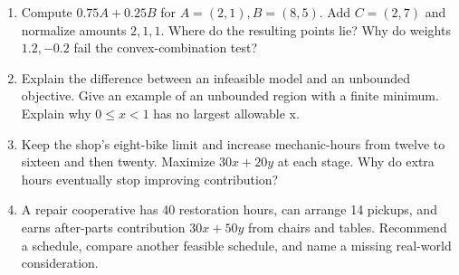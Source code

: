 \documentclass[11pt,letterpaper]{article}
\begin{document}
\begin{enumerate}
\item Compute $0.75A+0.25B$ for $A=(2,1),B=(8,5)$. Add $C=(2,7)$ and normalize amounts $2,1,1$. Where do the resulting points lie? Why do weights $1.2,-0.2$ fail the convex-combination test?
\item Explain the difference between an infeasible model and an unbounded objective. Give an example of an unbounded region with a finite minimum. Explain why $0\leq x<1$ has no largest allowable x.
\item Keep the shop's eight-bike limit and increase mechanic-hours from twelve to sixteen and then twenty. Maximize $30x+20y$ at each stage. Why do extra hours eventually stop improving contribution?
\item A repair cooperative has 40 restoration hours, can arrange 14 pickups, and earns after-parts contribution $30x+50y$ from chairs and tables. Recommend a schedule, compare another feasible schedule, and name a missing real-world consideration.
\end{enumerate}
\end{document}
